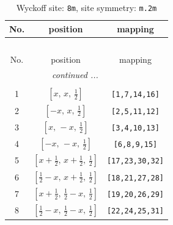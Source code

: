 \documentclass[fleqn,8pt]{jsarticle}
\begin{document}
\begin{longtable}{ccc}
\caption{Wyckoff site: {\tt 8m}, site symmetry: {\tt m.2m}}
 \\
 \hline \hline
No. & position & mapping \\ \hline \endfirsthead

\multicolumn{2}{l}{\tablename\ \thetable{}} \\
 \hline \hline
No. & position & mapping \\ \hline \endhead

 \hline \hline
\multicolumn{2}{r}{\footnotesize\it continued ...} \\ \endfoot

 \hline \hline
\multicolumn{2}{r}{} \\ \endlastfoot

1 & $\left[ x,\, x,\, \frac{1}{2} \right]$ & {\tt [1,7,14,16]} \\ \hline
2 & $\left[ - x,\, x,\, \frac{1}{2} \right]$ & {\tt [2,5,11,12]} \\ \hline
3 & $\left[ x,\, - x,\, \frac{1}{2} \right]$ & {\tt [3,4,10,13]} \\ \hline
4 & $\left[ - x,\, - x,\, \frac{1}{2} \right]$ & {\tt [6,8,9,15]} \\ \hline
5 & $\left[ x + \frac{1}{2},\, x + \frac{1}{2},\, \frac{1}{2} \right]$ & {\tt [17,23,30,32]} \\ \hline
6 & $\left[ \frac{1}{2} - x,\, x + \frac{1}{2},\, \frac{1}{2} \right]$ & {\tt [18,21,27,28]} \\ \hline
7 & $\left[ x + \frac{1}{2},\, \frac{1}{2} - x,\, \frac{1}{2} \right]$ & {\tt [19,20,26,29]} \\ \hline
8 & $\left[ \frac{1}{2} - x,\, \frac{1}{2} - x,\, \frac{1}{2} \right]$ & {\tt [22,24,25,31]} \\
\end{longtable}
\renewcommand{\arraystretch}{1.2}
\end{document}
